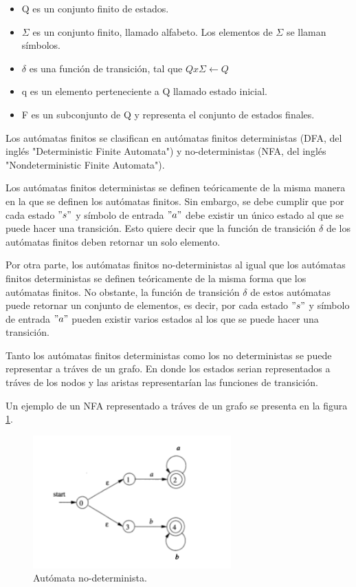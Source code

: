 \begin{itemize}

\item Q es un conjunto finito de estados.

\item  $\Sigma$ es un conjunto finito, llamado alfabeto. Los elementos de $\Sigma$ se llaman símbolos.

\item $\delta$ es una función de transición, tal que $ Q x \Sigma \leftarrow Q$
 
\item  q  es un elemento perteneciente a Q llamado estado inicial.

\item F es un subconjunto de Q y representa el conjunto de estados finales.

\end{itemize}

Los autómatas finitos se clasifican en autómatas finitos deterministas (DFA, del inglés "Deterministic Finite Automata") y no-deterministas (NFA, del inglés "Nondeterministic Finite Automata").

Los autómatas finitos deterministas se definen teóricamente de la misma manera en la que se definen los autómatas finitos. Sin embargo, se debe cumplir que por cada estado $"s"$ y símbolo de entrada $"a"$ debe existir un único estado al que se puede hacer una transición. Esto quiere decir que la función de transición $\delta$ de los autómatas finitos deben retornar un solo elemento.

Por otra parte, los autómatas finitos no-deterministas al igual que los autómatas finitos deterministas se definen teóricamente de la misma forma que los autómatas finitos. No obstante, la función de transición $\delta$ de estos autómatas puede retornar un conjunto de elementos, es decir, por cada estado $"s"$ y símbolo de entrada $"a"$ pueden existir varios estados al los que se puede hacer una transición.

Tanto los autómatas finitos deterministas como los no deterministas se puede representar a tráves de un grafo. En donde los estados serian representados a tráves de los nodos y las aristas representarían las funciones de transición. 

Un ejemplo de un NFA representado a tráves de un grafo se presenta en la figura \ref{fig:NFA}.

\begin{figure}[tb]
\begin{center}
\includegraphics[width=3in]{./img/NFA.png}
\caption{Autómata no-determinista.\cite{automataFinito}}
\label{fig:NFA}
\end{center}
\end{figure}

